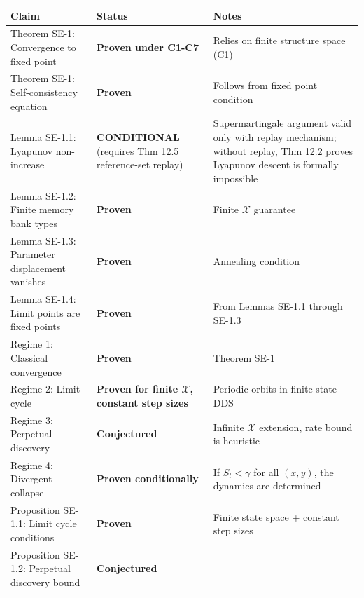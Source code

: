 \documentclass[
  12pt,
]{article}
\begin{document}
\begin{longtable}[]{@{}
  >{\raggedright\arraybackslash}p{}
  >{\raggedright\arraybackslash}p{}
  >{\raggedright\arraybackslash}p{}@{}}
\toprule\noalign{}
\begin{minipage}[b]{\linewidth}\raggedright
Claim
\end{minipage} & \begin{minipage}[b]{\linewidth}\raggedright
Status
\end{minipage} & \begin{minipage}[b]{\linewidth}\raggedright
Notes
\end{minipage} \\
\midrule\noalign{}
\endhead
\bottomrule\noalign{}
\endlastfoot
Theorem SE-1: Convergence to fixed point & \textbf{Proven under C1-C7} &
Relies on finite structure space (C1) \\
Theorem SE-1: Self-consistency equation & \textbf{Proven} & Follows from
fixed point condition \\
Lemma SE-1.1: Lyapunov non-increase & \textbf{CONDITIONAL} (requires Thm
12.5 reference-set replay) & Supermartingale argument valid only with
replay mechanism; without replay, Thm 12.2 proves Lyapunov descent is
formally impossible \\
Lemma SE-1.2: Finite memory bank types & \textbf{Proven} & Finite
\(\mathcal{X}\) guarantee \\
Lemma SE-1.3: Parameter displacement vanishes & \textbf{Proven} &
Annealing condition \\
Lemma SE-1.4: Limit points are fixed points & \textbf{Proven} & From
Lemmas SE-1.1 through SE-1.3 \\
Regime 1: Classical convergence & \textbf{Proven} & Theorem SE-1 \\
Regime 2: Limit cycle & \textbf{Proven for finite \(\mathcal{X}\),
constant step sizes} & Periodic orbits in finite-state DDS \\
Regime 3: Perpetual discovery & \textbf{Conjectured} & Infinite
\(\mathcal{X}\) extension, rate bound is heuristic \\
Regime 4: Divergent collapse & \textbf{Proven conditionally} & If
\(S_t < \gamma\) for all \((x,y)\), the dynamics are determined \\
Proposition SE-1.1: Limit cycle conditions & \textbf{Proven} & Finite
state space + constant step sizes \\
Proposition SE-1.2: Perpetual discovery bound & \textbf{Conjectured} &

\end{longtable}
\end{document}

